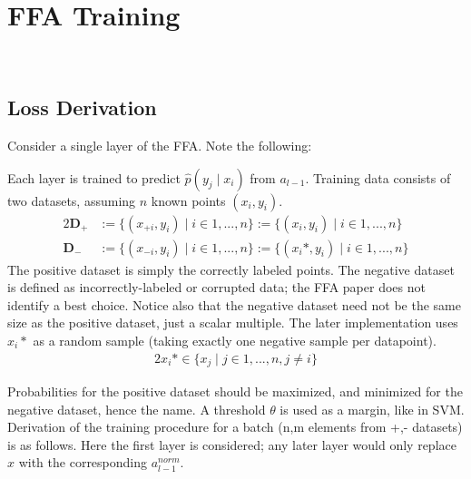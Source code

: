 \documentclass[12pt]{iopart}
\theoremstyle{break}
\begin{document}
\section{FFA Training}
\\
\subsection{Loss Derivation}
Consider a single layer of the FFA. Note the following:
\begin{description}\item
Each layer is trained to predict $\hat{p}(y_j \mid x_i)$ from $a_{l-1}$.
Training data consists of two datasets, assuming $n$ known points $(x_i,y_i)$.
\begin{alignat}{2}
\mathbf{D_{+}} &:= \{(x_{+i},y_i) \mid i \in 1,...,n \} := \{(x_i,y_i) \mid i \in 1,...,n \} \\
\mathbf{D_{-}} &:= \{(x_{-i},y_i) \mid i \in 1,...,n \} := \{(x_i*,y_i) \mid i \in 1,...,n \}
\end{alignat}
The positive dataset is simply the correctly labeled points. The negative dataset is defined as incorrectly-labeled or corrupted data; the FFA paper \cite{FFA23} does not identify a best choice.
Notice also that the negative dataset need not be the same size as the positive dataset, just a scalar multiple.
The later implementation uses $x_i*$ as a random sample (taking exactly one negative sample per datapoint).
\begin{alignat}{2}
x_i* \in \{x_j \mid j \in 1,...,n, j \neq i \}
\end{alignat}
\end{description}
Probabilities for the positive dataset should be maximized, and minimized for the negative dataset, hence the name. A threshold $\theta$ is used as a margin, like in SVM.
Derivation of the training procedure for a batch (n,m elements from +,- datasets) is as follows.
Here the first layer is considered; any later layer would only replace $x$ with the corresponding $a_{l-1}^{norm}$.\\
\end{document}
